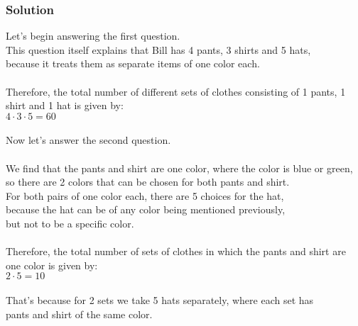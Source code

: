 \documentclass{article}
\begin{document}
\subsubsection*{Solution}
Let's begin answering the first question.\\
This question itself explains that Bill has 4 pants, 3 shirts and 5 hats,\\
because it treats them as separate items of one color each.\\
\\
Therefore, the total number of different sets of clothes consisting of 1 pants, 1 shirt and 1 hat is given by:\\
$4 \cdot 3 \cdot 5 = 60$\\
\\
Now let's answer the second question.\\
\\
We find that the pants and shirt are one color, where the color is blue or green,\\
so there are 2 colors that can be chosen for both pants and shirt.\\
For both pairs of one color each, there are 5 choices for the hat,\\
because the hat can be of any color being mentioned previously,\\
but not to be a specific color.\\
\\
Therefore, the total number of sets of clothes in which the pants and shirt are one color is given by:\\
$2 \cdot 5 = 10$\\
\\
That's because for 2 sets we take 5 hats separately, where each set has\\
pants and shirt of the same color.
\end{document}
